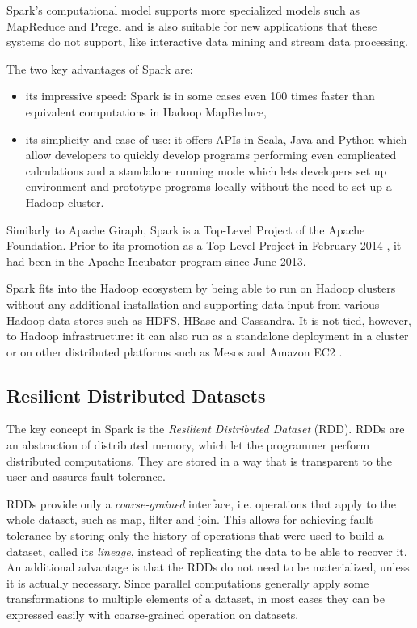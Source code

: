 Spark's computational model supports more specialized models such as MapReduce and Pregel and is also suitable for new applications that these systems do not support, like interactive data mining and stream data processing.

The two key advantages of Spark are:
\begin{itemize}
\item its impressive speed: Spark is in some cases even 100 times faster than equivalent computations in Hadoop MapReduce,
\item its simplicity and ease of use: it offers  APIs in Scala, Java and Python which allow developers to quickly develop programs performing even complicated calculations and a standalone running mode which lets developers set up environment and prototype programs locally without the need to set up a Hadoop cluster.
\end{itemize}

Similarly to Apache Giraph, Spark is a Top-Level Project of the Apache Foundation. Prior to its promotion as a Top-Level Project in February 2014 \cite{sparktoplevel}, it had been in the Apache Incubator program since June 2013. 

Spark fits into the Hadoop ecosystem by being able to run on Hadoop clusters without any additional installation and supporting data input from various Hadoop data stores such as HDFS, HBase and Cassandra. It is not tied, however, to Hadoop infrastructure: it can also run as a standalone deployment in a cluster or on other distributed platforms such as Mesos \cite{mesos} and Amazon EC2 \cite{ec2}.

\subsection{Resilient Distributed Datasets}
The key concept in Spark is the \emph{Resilient Distributed Dataset} (RDD). RDDs are an abstraction of distributed memory, which let the programmer perform distributed computations. They are stored in a way that is transparent to the user and assures fault tolerance.

RDDs provide only a \emph{coarse-grained} interface, i.e. operations that apply to the whole dataset, such as map, filter and join. This allows for achieving fault-tolerance by storing only the history of operations that were used to build a dataset, called its \emph{lineage}, instead of replicating the data to be able to recover it. An additional advantage is that the RDDs do not need to be materialized, unless it is actually necessary. Since parallel computations generally apply some transformations to multiple elements of a dataset, in most cases they can be expressed easily with coarse-grained operation on datasets.

